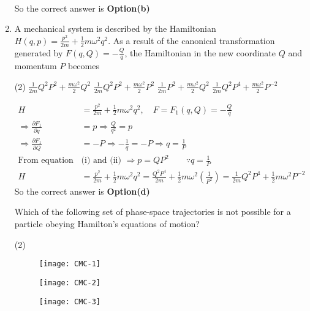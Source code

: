 \begin{enumerate}
\begin{answer}
$$\begin{aligned}
\end{aligned}
$$
So the correct answer is \textbf{Option(b)}
\end{answer}
	\item A mechanical system is described by the Hamiltonian $H(q, p)=\frac{p^{2}}{2 m}+\frac{1}{2} m \omega^{2} q^{2}$. As a result of the canonical transformation generated by $F(q, Q)=-\frac{Q}{q}$, the Hamiltonian in the new coordinate $Q$ and momentum $P$ becomes
{}
	 \begin{tasks}(2)
		\task[\textbf{a.}]$\frac{1}{2 m} Q^{2} P^{2}+\frac{m \omega^{2}}{2} Q^{2}$
		\task[\textbf{b.}]$\frac{1}{2 m} Q^{2} P^{2}+\frac{m \omega^{2}}{2} P^{2}$
		\task[\textbf{c.}]$\frac{1}{2 m} P^{2}+\frac{m \omega^{2}}{2} Q^{2}$
		\task[\textbf{d.}] $\frac{1}{2 m} Q^{2} P^{4}+\frac{m \omega^{2}}{2} P^{-2}$
	\end{tasks}
\begin{answer}
	$$
	\begin{aligned}
	H&=\frac{p^{2}}{2 m}+\frac{1}{2} m \omega^{2} q^{2}, \quad F=F_{1}(q, Q)=-\frac{Q}{q}\\
	\Rightarrow \frac{\partial F_{1}}{\partial q}&=p \Rightarrow \frac{Q}{q^{2}}=p\\
	\Rightarrow \frac{\partial F_{1}}{\partial Q}&=-P \Rightarrow-\frac{1}{q}=-P \Rightarrow q=\frac{1}{P}\\
	\text{From equation }&\text{(i) and (ii) }\Rightarrow p=Q P^{2}\qquad
	\because q=\frac{1}{P}\\
	H&=\frac{p^{2}}{2 m}+\frac{1}{2} m \omega^{2} q^{2}=\frac{Q^{2} P^{4}}{2 m}+\frac{1}{2} m \omega^{2}\left(\frac{1}{P^{2}}\right)=\frac{1}{2 m} Q^{2} P^{4}+\frac{1}{2} m \omega^{2} P^{-2}
\end{aligned}
$$
So the correct answer is \textbf{Option(d)}
\end{answer}
	\question Which of the following set of phase-space trajectories is not possible for a particle obeying Hamilton's equations of motion?
{}
\begin{tasks}(2)
\task[\textbf{A.}] \begin{figure}[H]
	\centering
	\texttt{[image: CMC-1]}
\end{figure}
\task[\textbf{B.}] \begin{figure}[H]
	\centering
	\texttt{[image: CMC-2]}
\end{figure}
\task[\textbf{C.}] \begin{figure}[H]
	\centering
	\texttt{[image: CMC-3]}

\end{figure}
\end{tasks}
\end{enumerate}
